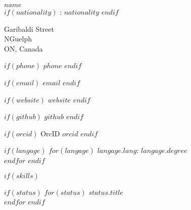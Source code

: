 \documentclass[$fontsize$, letterpaper]{article}
\begin{document}
\begin{multicols}{2}


{\LARGE \textbf{$name$}}\\


$if(nationality)$
: $nationality$
$endif$

\vspace*{.1cm}

\faHome {} Garibaldi Street \\ \hspace*{.6cm} NGuelph \\ \hspace*{.6cm} ON, Canada

$if(phone)$
\faPhone \quad $phone$
$endif$

$if(email)$
\faEnvelope \quad \href{mailto:$email$}{$email$}
$endif$

$if(website)$
\faGlobe \quad \href{http://$website$}{$website$}
$endif$

$if(github)$
\faGithub \quad \href{https://github.com/$github$}{$github$}
$endif$

$if(orcid)$
OrcID \quad \href{http://orcid.org/$orcid$}{$orcid$}
$endif$

\vspace{.2cm}


$if(langage)$
$for(langage)$
\textbf{$langage.lang$}: $langage.degree$ \\
$endfor$
$endif$


$if(skills)$

\columnbreak


$if(status)$
$for(status)$
{\large\textbf{$status.title$}} \\
$endfor$
$endif$

%



\vspace{-.4cm}


\end{multicols}
\end{document}
